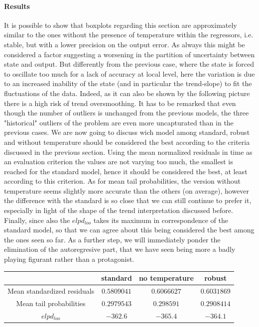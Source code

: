 \documentclass[11pt,twoside]{report}
\begin{document}
\paragraph{Results}
It is possible to show that boxplots regarding this section are approximately similar to the ones without the presence of temperature within the regressors, i.e. stable, but with a lower precision on the output error. As always this might be considered a factor suggesting a worsening in the partition of uncertainty between state and output. But differently from the previous case, where the state is forced to oscillate too much for a lack of accuracy at local level, here the variation is due to an increased inability of the state (and in particular the trend-slope) to fit the fluctuations of the data. Indeed, as it can also be shown by the following picture there is a high risk of trend oversmoothing.
It has to be remarked that even though the number of outliers is unchanged from the previous models, the three "historical" outliers of the problem are even more uncapturated than in the previous cases. We are now going to discuss wich model among standard, robust and without temperature should be considered the best according to the criteria discussed in the previous section. Using the mean normalized residuals in time as an evaluation criterion the values are not varying too much, the smallest is reached for the standard model, hence it should be considered the best, at least according to this criterion. As for mean tail probabilities, the version without temperature seems slightly more accurate than the others (on average), however the difference with the standard is so close that we can still continue to prefer it, especially in light of the shape of the trend interpretation discussed before. Finally, since also the $ elpd_{loo} $ takes its maximum in correspondence of the standard model, so that we can agree about this being considered the best among the ones seen so far. As a further step, we will immediately ponder the elimination  of the autoregresive part, that we have seen being more a badly playing figurant rather than a protagonist.

\begin{table}[!htb]
		\centering
		\begin{tabular}{|c|c|c|c|}
			\hline
			& standard & no temperature & robust \\
			\hline
			Mean standardized residuals &$  0.5809041 $ & $  0.6066627 $ &$  0.6031869 $\\
			\hline
			Mean tail probabilities &$ 0.2979543 $ & $  0.298591 $ &$  0.2908414 $\\
			\hline
			$ elpd_{loo} $ &$ -362.6 $ & $  -365.4 $ &$  -364.1 $\\
			\hline
		\end{tabular}
\end{table}
 
\end{document}
